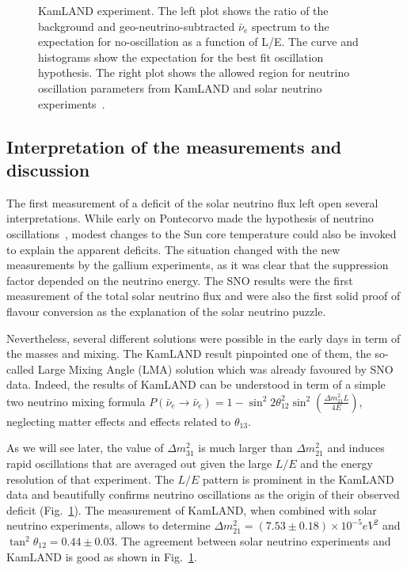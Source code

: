 \begin{figure}[htbp]
\begin{minipage}{.46\linewidth}
   \end{minipage}
    \caption{KamLAND experiment. The left plot shows the ratio of the background and geo-neutrino-subtracted $\bar{\nu}_e$
spectrum to the expectation for no-oscillation as a function of
L/E. The curve and histograms show the expectation for the best fit oscillation hypothesis. The right plot shows the allowed region for neutrino oscillation parameters from
KamLAND and solar neutrino experiments~\cite{Gando:2013nba}.} 
 \label{fig:sol-kam}
\end{figure}


\subsection{Interpretation of the measurements and discussion}
\label{subsec:solarinter}

The first measurement of a deficit of the solar neutrino flux left open several interpretations. While early on Pontecorvo made the hypothesis of neutrino oscillations~\cite{pontecorvo67}, modest changes to the Sun core temperature could also be invoked to explain the apparent deficits. 
The situation changed with the new measurements by the gallium experiments, as it was clear that the suppression factor depended on the neutrino energy. The SNO results were the first measurement of the total solar neutrino flux and were also the first solid proof of flavour conversion as the explanation of the solar neutrino puzzle. 

Nevertheless, several different solutions were possible in the early days in term of the masses and mixing. The KamLAND result pinpointed one of them, the so-called Large Mixing Angle (LMA) solution which was already favoured by SNO data. Indeed, the results of KamLAND can be understood in term of a simple two neutrino mixing formula $ P(\bar{\nu}_e \rightarrow \bar{\nu}_e ) = 1 - \sin^2 2 \theta_{12}^2 \sin^2 (\frac{\Delta m^2_{21} L}{4 E}) $, neglecting matter effects and effects related to $\theta_{13}$. 

As we will see later, the value of $\Delta m^2_{31}$ is much larger than $\Delta m^2_{21}$ and induces rapid oscillations that are averaged out given the large $L/E$ and the energy resolution of that experiment. The $L/E$ pattern is prominent in the KamLAND data and beautifully confirms neutrino oscillations as the origin of their observed deficit (Fig.~\ref{fig:sol-kam}). The measurement of KamLAND, when combined with solar neutrino experiments, allows to determine $\Delta m^2_{21} = (7.53 \pm 0.18) \times 10^{-5}
eV^2$ and $\tan^2 \theta_{12} = 0.44 \pm 0.03$. The agreement between solar neutrino experiments and KamLAND is good as shown in Fig.~\ref{fig:sol-kam}.

